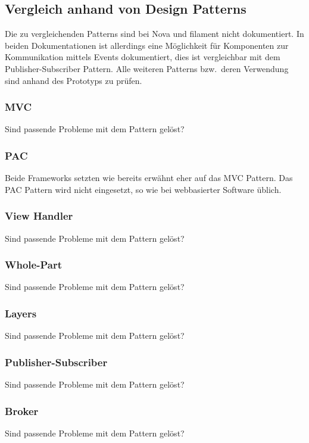 \subsection{Vergleich anhand von Design Patterns}
Die zu vergleichenden Patterns sind bei Nova und filament nicht dokumentiert.
In beiden Dokumentationen ist allerdings eine Möglichkeit für Komponenten zur Kommunikation mittels Events dokumentiert, dies ist vergleichbar mit dem Publisher-Subscriber Pattern.
Alle weiteren Patterns bzw.\ deren Verwendung sind anhand des Prototyps zu prüfen.

\subsubsection{MVC}
\color{red}
Sind passende Probleme mit dem Pattern gelöst?
\color{black}

\subsubsection{PAC}
Beide Frameworks setzten wie bereits erwähnt eher auf das MVC Pattern.
Das PAC Pattern wird nicht eingesetzt, so wie bei webbasierter Software üblich.

\subsubsection{View Handler}
\color{red}
Sind passende Probleme mit dem Pattern gelöst?
\color{black}

\subsubsection{Whole-Part}
\color{red}
Sind passende Probleme mit dem Pattern gelöst?
\color{black}

\subsubsection{Layers}
\color{red}
Sind passende Probleme mit dem Pattern gelöst?
\color{black}

\subsubsection{Publisher-Subscriber}
\color{red}
Sind passende Probleme mit dem Pattern gelöst?
\cite{filament-docs-events}
\cite{nova-docs-events}
\color{black}

\subsubsection{Broker}
\color{red}
Sind passende Probleme mit dem Pattern gelöst?
\color{black}

